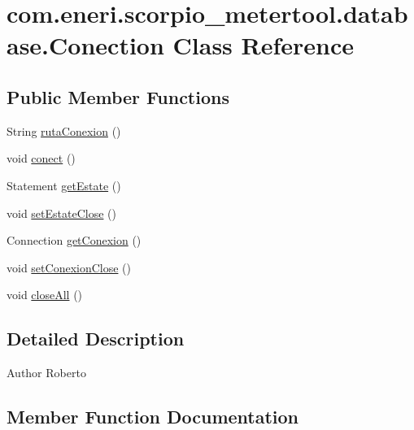 \hypertarget{classcom_1_1eneri_1_1scorpio__metertool_1_1database_1_1_conection}{}\section{com.\+eneri.\+scorpio\+\_\+metertool.\+database.\+Conection Class Reference}
\label{classcom_1_1eneri_1_1scorpio__metertool_1_1database_1_1_conection}
\subsection*{Public Member Functions}
\begin{DoxyCompactItemize}
\item 
String \hyperlink{classcom_1_1eneri_1_1scorpio__metertool_1_1database_1_1_conection_a395654367111c56df63aca28756b2ec2}{ruta\+Conexion} ()
\item 
void \hyperlink{classcom_1_1eneri_1_1scorpio__metertool_1_1database_1_1_conection_ad06369570ef20d69243002d2b7b5341f}{conect} ()
\item 
Statement \hyperlink{classcom_1_1eneri_1_1scorpio__metertool_1_1database_1_1_conection_afbee379e00e4b5d8278b2810a0431394}{get\+Estate} ()
\item 
void \hyperlink{classcom_1_1eneri_1_1scorpio__metertool_1_1database_1_1_conection_ac1f8c5f49eaa834f82f9d3ebdb1c6f64}{set\+Estate\+Close} ()
\item 
Connection \hyperlink{classcom_1_1eneri_1_1scorpio__metertool_1_1database_1_1_conection_ab93264e2bdcdc92fec7b3c2bb5da1992}{get\+Conexion} ()
\item 
void \hyperlink{classcom_1_1eneri_1_1scorpio__metertool_1_1database_1_1_conection_a64047e2bfaea57fcb9f9cef6016faba2}{set\+Conexion\+Close} ()
\item 
void \hyperlink{classcom_1_1eneri_1_1scorpio__metertool_1_1database_1_1_conection_a7129ae370f0d4f8efcdab65cda60c655}{close\+All} ()
\end{DoxyCompactItemize}


\subsection{Detailed Description}
\begin{DoxyAuthor}{Author}
Roberto 
\end{DoxyAuthor}


\subsection{Member Function Documentation}
\mbox{\label{classcom_1_1eneri_1_1scorpio__metertool_1_1database_1_1_conection_a7129ae370f0d4f8efcdab65cda60c655}} 
